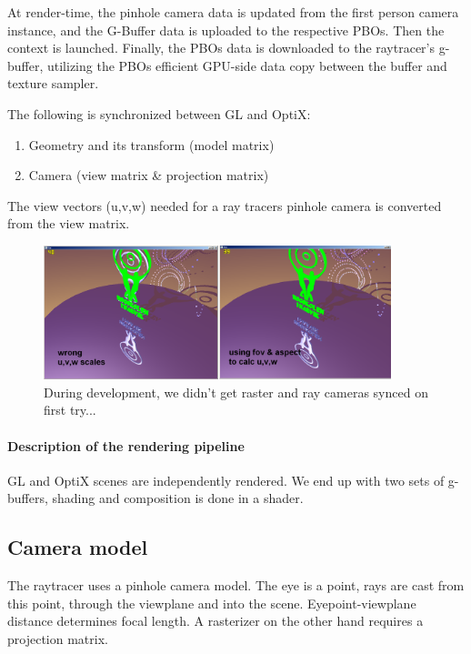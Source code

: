 At render-time, the pinhole camera data is updated from the first person camera instance, and the G-Buffer data is uploaded to the respective PBOs. Then the context is launched. Finally, the PBOs data is downloaded to the raytracer's g-buffer, utilizing the PBOs efficient GPU-side data copy between the buffer and texture sampler.

The following is synchronized between GL and OptiX:

\begin{enumerate}
	\item Geometry and its transform (model matrix)
	\item Camera (view matrix \& projection matrix)
\end{enumerate}

The view vectors (u,v,w) needed for a ray tracers pinhole camera is converted from the view matrix.

\begin{figure}[H]
  \centering
  \includegraphics[width=0.90\textwidth]{Media/implementation_camera.png}
  \caption{During development, we didn't get raster and ray cameras synced on first try...}   
  \label{fig:raster_ray_camera}
\end{figure}

\paragraph{Description of the rendering pipeline}

GL and OptiX scenes are independently rendered. We end up with two sets of g-buffers, shading and composition is done in a shader.

\subsection{Camera model}
The raytracer uses a pinhole camera model. The eye is a point, rays are cast from this point, through the viewplane and into the scene. Eyepoint-viewplane distance determines focal length. A rasterizer on the other hand requires a projection matrix.

